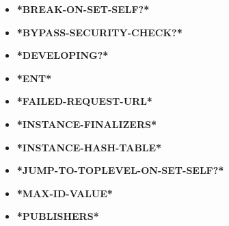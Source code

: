 \documentclass [11pt]{book}
\begin{document}
\begin{itemize}

\item {}
\label{prim:*break-on-set-self?*}
\textbf{*BREAK-ON-SET-SELF?*}





\item {}
\label{prim:*bypass-security-check?*}
\textbf{*BYPASS-SECURITY-CHECK?*}





\item {}
\label{prim:*developing?*}
\textbf{*DEVELOPING?*}





\item {}
\label{prim:*ent*}
\textbf{*ENT*}





\item {}
\label{prim:*failed-request-url*}
\textbf{*FAILED-REQUEST-URL*}





\item {}
\label{prim:*instance-finalizers*}
\textbf{*INSTANCE-FINALIZERS*}





\item {}
\label{prim:*instance-hash-table*}
\textbf{*INSTANCE-HASH-TABLE*}





\item {}
\label{prim:*jump-to-toplevel-on-set-self?*}
\textbf{*JUMP-TO-TOPLEVEL-ON-SET-SELF?*}





\item {}
\label{prim:*max-id-value*}
\textbf{*MAX-ID-VALUE*}





\item {}
\label{prim:*publishers*}
\textbf{*PUBLISHERS*}






\end{itemize}
\end{document}
